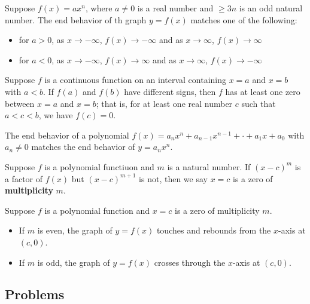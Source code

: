 \begin{definition}[End Behavior of Functions $f(x)=ax^n$, n is odd]
    Suppose $f(x) = ax^n$, where $a \neq 0$ is a real number and $ \geq 3n$ is an odd natural number. The end behavior of th graph $y=f(x)$ matches one of the following:
    \begin{itemize}
        \item for $a>0$, as $x \to -\infty$, $f(x)\to -\infty$ and as $x \to \infty$, $f(x) \to \infty$
        \item for $a<0$, as $x \to -\infty$, $f(x)\to \infty$ and as $x \to \infty$, $f(x) \to -\infty$
    \end{itemize}
\end{definition}

\begin{definition}
    Suppose $f$ is a continuous function on an interval containing $x=a$ and $x=b$ with $a<b$. If $f(a)$ and $f(b)$ have different signs, then $f$ has at least one zero between $x=a$ and $x=b$; that is, for at least one real number $c$ such that $a<c<b$, we have $f(c) = 0$.
\end{definition}

\begin{definition}
    The end behavior of a polynomial $f(x)=a_nx^n + a_{n-1}x^{n-1}+\cdot+a_1x+a_0$ with $a_n \neq 0$ matches the end behavior of $y=a_nx^n$.
\end{definition}

\begin{definition}[Multiplicity]
    Suppose $f$ is a polynomial functiuon and $m$ is a natural number. If $(x-c)^m$ is a factor of $f(x)$ but $(x-c)^{m+1}$ is not, then we say $x=c$ is a zero of \textbf{multiplicity} $m$.
\end{definition}

\begin{definition}
    Suppose $f$ is a polynomial function and $x=c$ is a zero of multiplicity $m$.
    \begin{itemize}
        \item If $m$ is even, the graph of $y=f(x)$ touches and rebounds from the $x$-axis at $(c,0)$.
        \item If $m$ is odd, the graph of $y=f(x)$ crosses through the $x$-axis at $(c,0)$.
    \end{itemize}
\end{definition}

\subsection{Problems}
